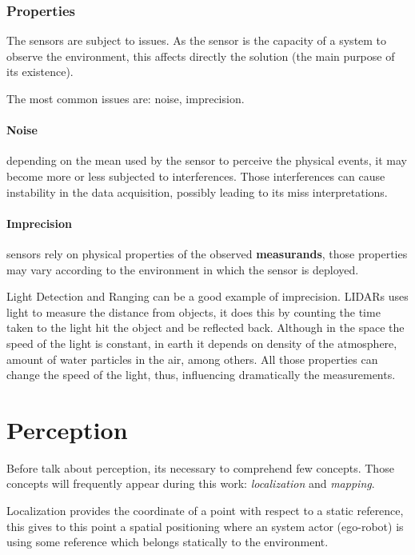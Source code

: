 \subsubsection{Properties}

The sensors are subject to issues. As the sensor is the capacity of a system to observe the environment, this affects directly the solution (the main purpose of its existence).

The most common issues are: noise, imprecision. 

\paragraph{Noise} depending on the mean used by the sensor to perceive the physical events, it may become more or less subjected to interferences. Those interferences can cause instability in the data acquisition, possibly leading to its miss interpretations.

\paragraph{Imprecision} sensors rely on physical properties of the observed \textbf{measurands}, those properties may vary according to the environment in which the sensor is deployed.

Light Detection and Ranging can be a good example of imprecision. LIDARs uses light to measure the distance from objects, it does this by counting the time taken to the light hit the object and be reflected back. Although in the space the speed of the light is constant, in earth it depends on density of the atmosphere, amount of water particles in the air, among others. All those properties can change the speed of the light, thus, influencing dramatically the measurements.

\section{Perception}

Before talk about perception, its necessary to comprehend few concepts. Those concepts will frequently appear during this work: \textit{localization} and \textit{mapping}.

Localization provides the coordinate of a point with respect to a static reference, this gives to this point a spatial positioning where an system actor (ego-robot) is using some reference which belongs statically to the environment.  

